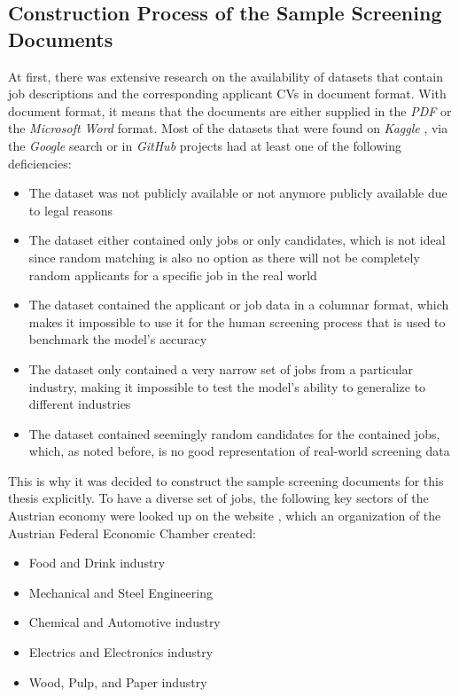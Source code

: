 \documentclass[draft,final]{thesisclass} %
\begin{document}
\subsection{Construction Process of the Sample Screening Documents} \label{construction_process_of_the_sample_screening_documents}
At first, there was extensive research on the availability of datasets that contain job descriptions and the corresponding applicant \acs{CV}s in document format. 
With document format, it means that the documents are either supplied in the \textit{PDF} or the \textit{Microsoft Word} format.
Most of the datasets that were found on \textit{Kaggle} \parencite{kaggle}, via the \textit{Google} search or in \textit{GitHub} projects had at least one of the following deficiencies:
\begin{itemize}
    \item The dataset was not publicly available or not anymore publicly available due to legal reasons
    \item The dataset either contained only jobs or only candidates, which is not ideal since random matching is also no option as there will not be completely random applicants for a specific job in the real world
    \item The dataset contained the applicant or job data in a columnar format, which makes it impossible to use it for the human screening process that is used to benchmark the model's accuracy
    \item The dataset only contained a very narrow set of jobs from a particular industry, making it impossible to test the model's ability to generalize to different industries
    \item The dataset contained seemingly random candidates for the contained jobs, which, as noted before, is no good representation of real-world screening data
\end{itemize}
This is why it was decided to construct the sample screening documents for this thesis explicitly.
To have a diverse set of jobs, the following key sectors of the Austrian economy were looked up on the website \parencite{austria_key_sectors}, which an organization of the Austrian Federal Economic Chamber created:
\begin{itemize}
    \item Food and Drink industry
    \item Mechanical and Steel Engineering
    \item Chemical and Automotive industry
    \item Electrics and Electronics industry
    \item Wood, Pulp, and Paper industry
\end{itemize}
\end{document}
